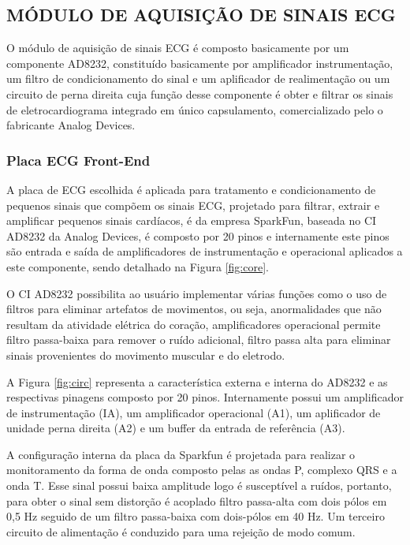 \documentclass[12pt, a4paper]{article}
\begin{document}
\subsection{MÓDULO DE AQUISIÇÃO DE SINAIS ECG}
\hspace*{0.8cm} O módulo de aquisição de sinais ECG é composto basicamente por um componente AD8232, constituído basicamente por amplificador  instrumentação, um filtro de condicionamento do sinal e um aplificador de realimentação ou um circuito de perna direita cuja função desse componente é obter e filtrar os sinais de eletrocardiograma integrado em único capsulamento, comercializado pelo o fabricante Analog Devices.

\subsubsection{Placa ECG Front-End}
\hspace*{0.8cm}A placa de ECG escolhida é aplicada para  tratamento e condicionamento de pequenos sinais que compõem os sinais  ECG, projetado para filtrar, extrair e amplificar pequenos sinais cardíacos, é da empresa SparkFun, baseada no CI AD8232 da Analog Devices, é composto por 20 pinos e internamente este pinos são entrada e saída de amplificadores de instrumentação e operacional aplicados a este componente, sendo detalhado na Figura \ref{fig:core}.

O CI AD8232 possibilita ao usuário implementar várias funções como o uso de filtros para eliminar artefatos de movimentos, ou seja, anormalidades que não resultam da atividade elétrica do coração, amplificadores operacional permite filtro passa-baixa para remover o ruído adicional, filtro passa alta para eliminar sinais provenientes do movimento muscular e do eletrodo.

A Figura \ref{fig:circ} representa a característica externa e interna do AD8232 e as respectivas pinagens composto por 20 pinos. Internamente possui um amplificador de instrumentação (IA), um amplificador operacional (A1), um aplificador de unidade perna direita (A2) e um buffer da entrada de referência (A3).

A configuração interna da placa da Sparkfun é projetada para realizar o monitoramento da forma de onda composto pelas as ondas P, complexo QRS e a onda T. Esse sinal possui baixa amplitude logo é susceptível a ruídos, portanto, para obter o sinal sem distorção é acoplado  filtro passa-alta com dois pólos em 0,5 Hz seguido de um filtro passa-baixa com dois-pólos em 40 Hz. Um terceiro circuito de alimentação é conduzido para uma rejeição de modo comum.
\end{document}

